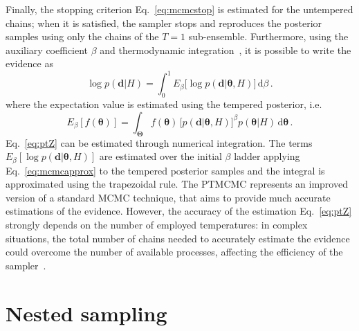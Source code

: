 \documentclass[prd,aps,twocolumn,a4paper,showkeys,nofootinbib,floatfix]{revtex4-1}
\newcommand{\be}{\begin{equation}}
\newcommand{\ee}{\end{equation}}
\def\params{\boldsymbol{\theta}}
\def\paramspace{\boldsymbol{\Theta}}
\def\data{\textbf{d}}
\def\d{\text{d}}
\begin{document}
Finally, the stopping criterion Eq.~\eqref{eq:mcmcstop} is estimated for the untempered chains;
when it is satisfied, the sampler stops and reproduces the posterior samples using 
only the chains of the $T=1$ sub-ensemble.
Furthermore, using the auxiliary coefficient $\beta$ 
and thermodynamic integration~\cite{Goggans:2004,Lartillot:2006},
it is possible to write the evidence as
\be
\label{eq:ptZ}
\log p(\data|H) = \int_0^1E_\beta\big[ \log p(\data|\params,H)\big] \,\d\beta\,.
\ee
where the expectation value is estimated using the tempered posterior, i.e.
\be
\label{eq:tempexp}
E_\beta\left[ f(\params)\right] = \int_{\paramspace} f(\params )\, \big[ p(\data|\params,H) \big]^{\beta} p(\params|H) \, \d\params\,.
\ee
Eq.~\eqref{eq:ptZ} can be estimated through numerical integration.
The terms $E_\beta\left[ \log p(\data|\params,H)\right]$ 
are estimated over the initial $\beta$ ladder
applying Eq.~\eqref{eq:mcmcapprox} to the tempered posterior samples
and the integral is approximated using the trapezoidal rule.
The PTMCMC represents an improved version of a standard MCMC technique, 
that aims to provide much accurate estimations of the evidence.
However, the accuracy of the estimation Eq.~\eqref{eq:ptZ} strongly depends on the number of employed temperatures: in complex situations, 
the total number of chains needed to accurately estimate the evidence
could overcome the number of available processes, affecting the efficiency of the sampler~\cite{Gupta:2018}.

\section{Nested sampling} 
\label{app:nest}
\end{document}
